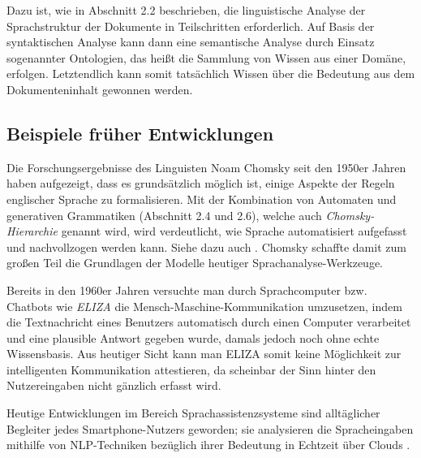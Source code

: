\documentclass[12pt]{report}
\begin{document}
Dazu ist, wie in Abschnitt 2.2 beschrieben, die linguistische Analyse der Sprachstruktur der Dokumente in Teilschritten erforderlich. Auf Basis der syntaktischen Analyse kann dann eine semantische Analyse durch Einsatz sogenannter Ontologien, das heißt die Sammlung von Wissen aus einer Domäne, erfolgen. Letztendlich kann somit tatsächlich Wissen über die Bedeutung aus dem Dokumenteninhalt gewonnen werden.

\subsection{Beispiele früher Entwicklungen}
Die Forschungsergebnisse des Linguisten Noam Chomsky seit den 1950er Jahren haben aufgezeigt, dass es grundsätzlich möglich ist, einige Aspekte der Regeln englischer Sprache zu formalisieren. Mit der Kombination von Automaten und generativen Grammatiken (Abschnitt 2.4 und 2.6), welche auch \textit{Chomsky-Hierarchie} genannt wird, wird verdeutlicht, wie Sprache automatisiert aufgefasst und nachvollzogen werden kann. Siehe dazu auch \cite{cho57}. Chomsky schaffte damit zum großen Teil die Grundlagen der Modelle heutiger Sprachanalyse-Werkzeuge.

Bereits in den 1960er Jahren versuchte man durch Sprachcomputer bzw. Chatbots wie \textit{ELIZA} \cite{wei66} die Mensch-Maschine-Kommunikation umzusetzen, indem die Textnachricht eines Benutzers automatisch durch einen Computer verarbeitet und eine plausible Antwort gegeben wurde, damals jedoch noch ohne echte Wissensbasis. Aus heutiger Sicht kann man ELIZA somit keine Möglichkeit zur \glqq   intelligenten\grqq{} Kommunikation attestieren, da scheinbar der Sinn hinter den Nutzereingaben nicht gänzlich erfasst wird.

Heutige Entwicklungen im Bereich Sprachassistenzsysteme sind alltäglicher Begleiter jedes Smartphone-Nutzers geworden; sie analysieren die Spracheingaben mithilfe von NLP-Techniken bezüglich ihrer Bedeutung in Echtzeit über Clouds \cite{hao14}.
\end{document}
